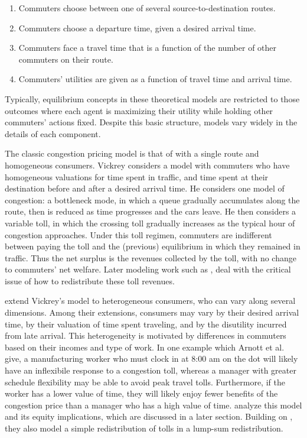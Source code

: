 \documentclass[JEL]{AEA}
\begin{document}
\begin{enumerate}
    \item Commuters choose between one of several source-to-destination routes.
    \item Commuters choose a departure time, given a desired arrival time.
    \item Commuters face a travel time that is a function of the number of other commuters on their route.
    \item Commuters' utilities are given as a function of travel time and arrival time.
\end{enumerate}

Typically, equilibrium concepts in these theoretical models are restricted to those outcomes where each agent is maximizing their utility while holding other commuters' actions fixed. Despite this basic structure, models vary widely in the details of each component. 

The classic congestion pricing model is that of \cite{vickrey-1969} with a single route and homogeneous consumers. Vickrey considers a model with commuters who have homogeneous valuations for time spent in traffic, and time spent at their destination before and after a desired arrival time. He considers one model of congestion: a bottleneck mode, in which a queue gradually accumulates along the route, then is reduced as time progresses and the cars leave. He then considers a variable toll, in which the crossing toll gradually increases as the typical hour of congestion approaches. Under this toll regimen, commuters are indifferent between paying the toll and the (previous) equilibrium in which they remained in traffic. Thus the net surplus is the revenues collected by the toll, with no change to commuters' net welfare. Later modeling work such as \cite{eliasson-2006}, deal with the critical issue of how to redistribute these toll revenues.

\cite{arnott-1994} extend Vickrey's model to heterogeneous consumers, who can vary along several dimensions. Among their extensions, consumers may vary by their desired arrival time, by their valuation of time spent traveling, and by the disutility incurred from late arrival. This heterogeneity is motivated by differences in commuters based on their incomes and type of work. In one example which Arnott et al. give, a manufacturing worker who must clock in at 8:00 am on the dot will likely have an inflexibile response to a congestion toll, whereas a manager with greater schedule flexibility may be able to avoid peak travel tolls. Furthermore, if the worker has a lower value of time, they will likely enjoy fewer benefits of the congestion price than a manager who has a high value of time. \cite{arnott-1994} analyze this model and its equity implications, which are discussed in a later section. Building on \cite{vickrey-1969}, they also model a simple redistribution of tolls in a lump-sum redistribution. 
\end{document}
